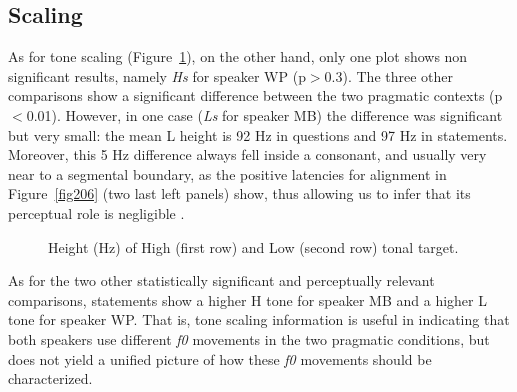 \subsection{Scaling}\label{sec232}
As for tone scaling (Figure~\ref{fig207}), on the other hand, only one plot shows non significant results, namely \textit{Hs} for speaker WP (p$>$0.3). The three other comparisons show a significant difference between the two pragmatic contexts (p$<$0.01). However, in one case (\textit{Ls} for speaker MB) the difference was significant but very small: the mean L height is 92 Hz in questions and 97 Hz in statements. Moreover, this 5 Hz difference always fell inside a consonant, and usually very near to a segmental boundary, as the positive latencies for alignment in Figure~\ref{fig206} (two last left panels) show, thus allowing us to infer that its perceptual role is negligible \citep{house1990tonal}. 

\begin{figure}
\centering
{}
\caption{Height (Hz) of High (first row) and Low (second row) tonal target.}
\label{fig207}\end{figure}

As for the two other statistically significant and perceptually relevant comparisons, statements show a higher H tone for speaker MB and a higher L tone for speaker WP. That is, tone scaling information is useful in indicating that both speakers use different \textit{f0} movements in the two pragmatic conditions, but does not yield a unified picture of how these \textit{f0} movements should be characterized. 

